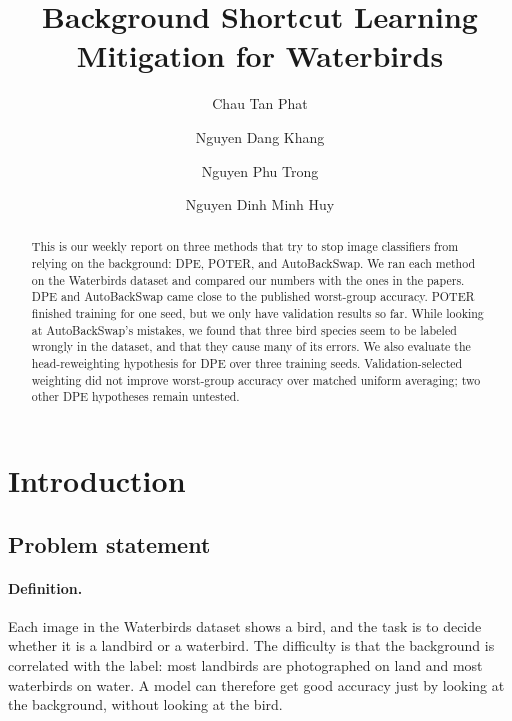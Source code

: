 \documentclass[runningheads]{llncs}
\begin{document}
%
\title{Background Shortcut Learning Mitigation for Waterbirds}
%
%
\author{Chau Tan Phat \and
Nguyen Dang Khang \and
Nguyen Phu Trong \and
Nguyen Dinh Minh Huy}
%
%
%
\maketitle
%
\begin{abstract}
This is our weekly report on three methods that try to stop image classifiers from relying on the background: DPE, POTER, and AutoBackSwap. We ran each method on the Waterbirds dataset and compared our numbers with the ones in the papers. DPE and AutoBackSwap came close to the published worst-group accuracy. POTER finished training for one seed, but we only have validation results so far. While looking at AutoBackSwap's mistakes, we found that three bird species seem to be labeled wrongly in the dataset, and that they cause many of its errors. We also evaluate the head-reweighting hypothesis for DPE over three training seeds. Validation-selected weighting did not improve worst-group accuracy over matched uniform averaging; two other DPE hypotheses remain untested.

\end{abstract}
%
\section{Introduction}
\subsection{Problem statement}
\paragraph{Definition.}
Each image in the Waterbirds dataset \cite{waterbirds} shows a bird, and the task is to decide whether it is a landbird or a waterbird. The difficulty is that the background is correlated with the label: most landbirds are photographed on land and most waterbirds on water. A model can therefore get good accuracy just by looking at the background, without looking at the bird.
\end{document}
